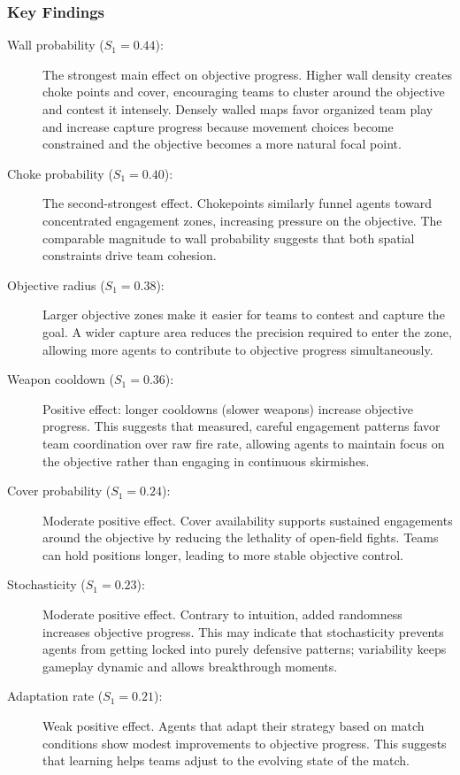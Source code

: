 \documentclass{assignment}
\begin{document}
\subsubsection{Key Findings}

\begin{description}
  \item[Wall probability ($S_1 = 0.44$):] The strongest main effect on objective progress. Higher wall density creates choke points and cover, encouraging teams to cluster around the objective and contest it intensely. Densely walled maps favor organized team play and increase capture progress because movement choices become constrained and the objective becomes a more natural focal point.
  
  \item[Choke probability ($S_1 = 0.40$):] The second-strongest effect. Chokepoints similarly funnel agents toward concentrated engagement zones, increasing pressure on the objective. The comparable magnitude to wall probability suggests that both spatial constraints drive team cohesion.
  
  \item[Objective radius ($S_1 = 0.38$):] Larger objective zones make it easier for teams to contest and capture the goal. A wider capture area reduces the precision required to enter the zone, allowing more agents to contribute to objective progress simultaneously.
  
  \item[Weapon cooldown ($S_1 = 0.36$):] Positive effect: longer cooldowns (slower weapons) increase objective progress. This suggests that measured, careful engagement patterns favor team coordination over raw fire rate, allowing agents to maintain focus on the objective rather than engaging in continuous skirmishes.
  
  \item[Cover probability ($S_1 = 0.24$):] Moderate positive effect. Cover availability supports sustained engagements around the objective by reducing the lethality of open-field fights. Teams can hold positions longer, leading to more stable objective control.
  
  \item[Stochasticity ($S_1 = 0.23$):] Moderate positive effect. Contrary to intuition, added randomness increases objective progress. This may indicate that stochasticity prevents agents from getting locked into purely defensive patterns; variability keeps gameplay dynamic and allows breakthrough moments.
  
  \item[Adaptation rate ($S_1 = 0.21$):] Weak positive effect. Agents that adapt their strategy based on match conditions show modest improvements to objective progress. This suggests that learning helps teams adjust to the evolving state of the match.
\end{description}
\end{document}
